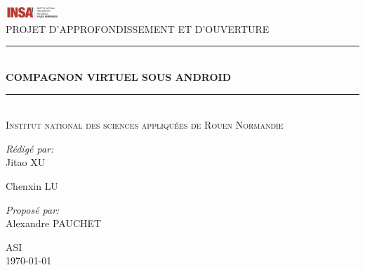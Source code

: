 \documentclass[pdftex, a4paper,12pt]{article}
\newcommand{\HRule}{\rule{\linewidth}{0.5mm}}
\begin{document}
 

\begin{titlepage}
\begin{center}

\includegraphics[width=0.15\textwidth]{./Logo_INSA_RN}\\[1cm]    

\textsc{\Large PROJET D'APPROFONDISSEMENT ET D'OUVERTURE}\\[0.5cm]

\HRule \\[0.8cm]
{\LARGE \bfseries COMPAGNON VIRTUEL SOUS ANDROID}\\[0.4cm]

\HRule \\[1.5cm]

\textsc{Institut national des sciences appliquées de Rouen Normandie}\\[1.5cm]

\begin{minipage}{0.4\textwidth}
\begin{flushleft} \large
\emph{Rédigé par:}\\
Jitao \textsc{XU}

Chenxin \textsc{LU}
\end{flushleft}
\end{minipage}
\begin{minipage}{0.4\textwidth}
\begin{flushright} \large
\emph{Proposé par:} \\
Alexandre \textsc{PAUCHET}
\end{flushright}
\end{minipage}

\vfill

\textsc{\large ASI}\\
{\large \today}

\end{center}
\end{titlepage}
\newpage

\tableofcontents

\newpage
{}


\newpage








\newpage


\end{document}
